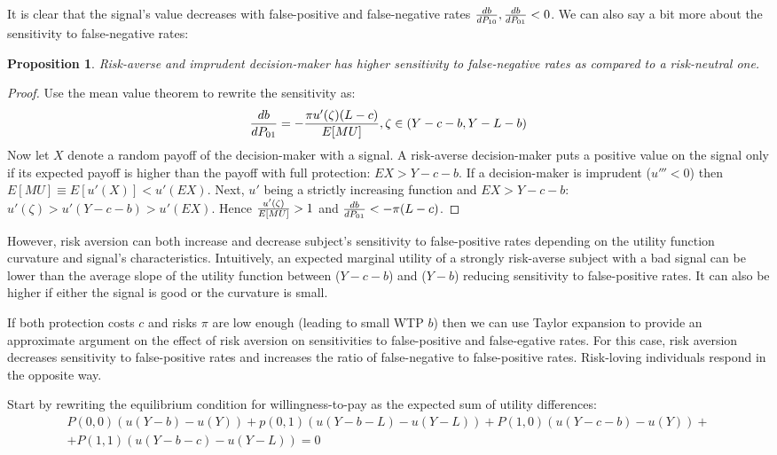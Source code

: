 \documentclass[12pt,a4paper]{article}
\newtheorem{theorem}{Proposition}
\begin{document}
It is clear that the signal's value decreases with false-positive and false-negative rates ${db\over dP_{10}},{db\over dP_{01}}<0$. We can also say a bit more about the sensitivity to false-negative rates:
\begin{theorem}
Risk-averse and imprudent decision-maker has higher sensitivity to false-negative rates as compared to a risk-neutral one.
\end{theorem}\label{thm:riskAverse}  \small
\begin{proof}
Use the mean value theorem to rewrite the sensitivity as:
$${db\over dP_{01}}=-{\pi u'(\zeta)(L-c)\over E[MU]},\zeta \in \left(Y-c-b, Y-L-b\right)$$
Now let $X$ denote a random payoff of the decision-maker with a signal. A risk-averse decision-maker puts a positive value on the signal only if its expected payoff is higher than the payoff with full protection: $EX>Y-c-b$. If a decision-maker is imprudent ($u'''<0$) then $E[MU]\equiv E[u'(X)]<u'(EX)$. Next, $u'$ being a strictly increasing function and $EX>Y-c-b$: $u'(\zeta)>u'(Y-c-b)>u'(EX)$. Hence ${u'(\zeta)\over E[MU]}>1$ and ${db\over dP_{01}}<-\pi(L-c)$. 
\end{proof}
\normalsize

However, risk aversion can both increase and decrease subject's sensitivity to false-positive rates depending on the utility function curvature and signal's characteristics. Intuitively, an expected marginal utility of a strongly risk-averse subject with a bad signal can be lower than the average slope of the utility function between ($Y-c-b$) and ($Y-b$) reducing sensitivity to false-positive rates. It can also be higher if either the signal is good or the curvature is small. 

If both protection costs $c$ and risks $\pi$ are low enough (leading to small WTP $b$) then we can use Taylor expansion to provide an approximate argument on the effect of risk aversion on sensitivities to false-positive and false-egative rates. For this case, risk aversion decreases sensitivity to false-positive rates and increases the ratio of false-negative to false-positive rates. Risk-loving individuals respond in the opposite way.

\small
Start by rewriting the equilibrium condition for willingness-to-pay as the expected sum of utility differences:
\begin{equation}
\begin{split}
P(0,0) (u(Y-b)-u(Y))+p(0,1)(u(Y-b-L)-u(Y-L))+P(1,0)(u(Y-c-b)-u(Y))+\\+P(1,1)(u(Y-b-c)-u(Y-L))=0
\end{split}
\end{equation}
\end{document}
